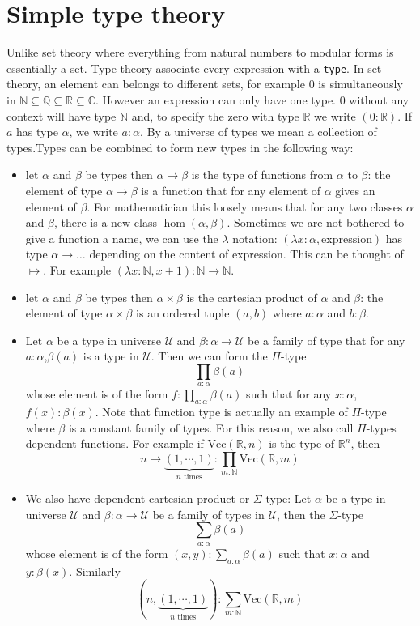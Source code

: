 \documentclass{report}
\theoremstyle{definition}
\begin{document}
\section{Simple type theory}
Unlike set theory where everything from natural numbers to modular forms is essentially a set. Type theory associate every expression with a {\tt \small type}. In set theory, an element can belongs to different sets, for example $0$ is simultaneously in $\mathbb N\subseteq\mathbb Q\subseteq\mathbb R\subseteq\mathbb C$. However an expression can only have one type. $0$ without any context will have type $\mathbb N$ and, to specify the zero with type $\mathbb R$ we write $(0:\mathbb R)$. If $a$ has type $\alpha$, we write $a:\alpha$. By a universe of types we mean a collection of types.Types can be combined to form new types in the following way:
\begin{itemize}
  \item let $\alpha$ and $\beta$ be types then $\alpha\to\beta$ is the type of functions from $\alpha$ to $\beta$: the element of type $\alpha\to\beta$ is a function that for any element of $\alpha$ gives an element of $\beta$. For mathematician this loosely means that for any two classes $\alpha$ and $\beta$, there is a new class $\hom(\alpha,\beta)$. Sometimes we are not bothered to give a function a name, we can use the $\lambda$ notation: $(\lambda x:\alpha, \text{expression})$ has type $\alpha\to\dots$ depending on the content of expression. This can be thought of $\mapsto$. For example $(\lambda x:\mathbb N, x+1):\mathbb{N}\to\mathbb{N}$.
  \item let $\alpha$ and $\beta$ be types then $\alpha\times\beta$ is the cartesian product of $\alpha$ and $\beta$: the element of type $\alpha\times\beta$ is an ordered tuple $(a,b)$ where $a:\alpha$ and $b:\beta$.
  \item Let $\alpha$ be a type in universe $\mathcal U$ and $\beta:\alpha\to\mathcal U$ be a family of type that for any $a:\alpha$,$\beta(a)$ is a type in $\mathcal U$. Then we can form the $\Pi$-type $$\prod_{a:\alpha}\beta(a)$$ whose element is of the form $f:\prod_{a:\alpha}\beta(a)$ such that for any $x:\alpha$, $f(x):\beta(x)$. Note that function type is actually an example of $\Pi$-type where $\beta$ is a constant family of types. For this reason, we also call $\Pi$-types dependent functions. For example if $\mathrm{Vec}(\mathbb{R},n)$ is the type of $\mathbb R^n$, then 
    $$n\mapsto\underbrace{(1,\cdots,1)}_{n\text{ times}}:\prod_{m:\mathbb N} \mathrm{Vec}(\mathbb R, m)$$
  \item We also have dependent cartesian product or $\Sigma$-type: Let $\alpha$ be a type in universe $\mathcal U$ and $\beta:\alpha\to\mathcal U$ be a family of types in $\mathcal U$, then the $\Sigma$-type $$\sum_{a:\alpha}\beta(a)$$ whose element is of the form $(x,y):\sum_{a:\alpha}\beta(a)$ such that $x:\alpha$ and $y:\beta(x)$. Similarly $$\left(n,\underbrace{(1,\cdots,1)}_{n\text{ times}}\right):\sum_{m:\mathbb N} \mathrm{Vec}(\mathbb R, m)$$
\end{itemize}
\end{document}
